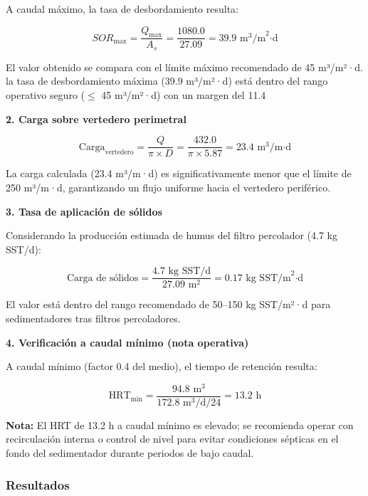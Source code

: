 \documentclass[12pt,a4paper]{article}
\begin{document}
A caudal máximo, la tasa de desbordamiento resulta:

\begin{equation}
SOR_{\max} = \frac{Q_{\max}}{A_s} = \frac{1080.0}{27.09} = 39.9 \text{ m}^3\text{/m}^2\text{·d}
\end{equation}

El valor obtenido se compara con el límite máximo recomendado de 45 m³/m²·d. la tasa de desbordamiento máxima (39.9 m³/m²·d) está dentro del rango operativo seguro ($\leq$ 45 m³/m²·d) con un margen del 11.4%

\textbf{2. Carga sobre vertedero perimetral}

\begin{equation}
\text{Carga}_{\text{vertedero}} = \frac{Q}{\pi \times D} = \frac{432.0}{\pi \times 5.87} = 23.4 \text{ m}^3\text{/m·d}
\end{equation}

La carga calculada (23.4 m³/m·d) es significativamente menor que el límite de 250 m³/m·d, garantizando un flujo uniforme hacia el vertedero periférico.

\textbf{3. Tasa de aplicación de sólidos}

Considerando la producción estimada de humus del filtro percolador (4.7 kg SST/d):

\begin{equation}
\text{Carga de sólidos} = \frac{4.7 \text{ kg SST/d}}{27.09 \text{ m}^2} = 0.17 \text{ kg SST/m}^2\text{·d}
\end{equation}

El valor está dentro del rango recomendado de 50--150 kg SST/m²·d para sedimentadores tras filtros percoladores.

\textbf{4. Verificación a caudal mínimo (nota operativa)}

A caudal mínimo (factor 0.4 del medio), el tiempo de retención resulta:

\begin{equation}
\text{HRT}_{\min} = \frac{94.8 \text{ m}^3}{172.8 \text{ m}^3\text{/d} / 24} = 13.2 \text{ h}
\end{equation}

\textbf{Nota:} El HRT de 13.2 h a caudal mínimo es elevado; se recomienda operar con recirculación interna o control de nivel para evitar condiciones sépticas en el fondo del sedimentador durante periodos de bajo caudal.

\subsubsection{Resultados}
\end{document}
